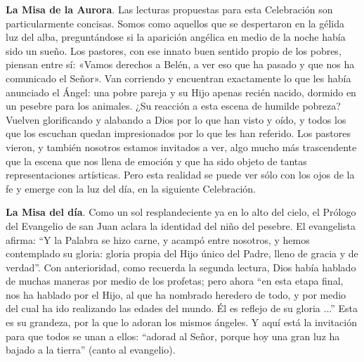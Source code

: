 \documentclass[]{article}
\begin{document}
\textbf{La Misa de la Aurora}. Las lecturas propuestas para esta
Celebración son particularmente concisas. Somos como aquellos que se
despertaron en la gélida luz del alba, preguntándose si la aparición
angélica en medio de la noche había sido un sueño. Los pastores, con ese
innato buen sentido propio de los pobres, piensan entre sí: «Vamos
derechos a Belén, a ver eso que ha pasado y que nos ha comunicado el
Señor». Van corriendo y encuentran exactamente lo que les había
anunciado el Ángel: una pobre pareja y su Hijo apenas recién nacido,
dormido en un pesebre para los animales. ¿Su reacción a esta escena de
humilde pobreza? Vuelven glorificando y alabando a Dios por lo que han
visto y oído, y todos los que los escuchan quedan impresionados por lo
que les han referido. Los pastores vieron, y también nosotros estamos
invitados a ver, algo mucho más trascendente que la escena que nos llena
de emoción y que ha sido objeto de tantas representaciones artísticas.
Pero esta realidad se puede ver sólo con los ojos de la fe y emerge con
la luz del día, en la siguiente Celebración.

\textbf{La Misa del día}. Como un sol resplandeciente ya en lo alto del
cielo, el Prólogo del Evangelio de san Juan aclara la identidad del niño
del pesebre. El evangelista afirma: ``Y la Palabra se hizo carne, y
acampó entre nosotros, y hemos contemplado su gloria: gloria propia del
Hijo único del Padre, lleno de gracia y de verdad''. Con anterioridad,
como recuerda la segunda lectura, Dios había hablado de muchas maneras
por medio de los profetas; pero ahora ``en esta etapa final, nos ha
hablado por el Hijo, al que ha nombrado heredero de todo, y por medio
del cual ha ido realizando las edades del mundo. Él es reflejo de su
gloria ...'' Esta es su grandeza, por la que lo adoran los mismos
ángeles. Y aquí está la invitación para que todos se unan a ellos:
``adorad al Señor, porque hoy una gran luz ha bajado a la tierra''
(canto al evangelio).
\end{document}
